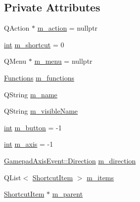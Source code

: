 \subsection*{Private Attributes}
\begin{DoxyCompactItemize}
\item 
Q\+Action $\ast$ \mbox{\hyperlink{class_q_g_b_a_1_1_shortcut_controller_1_1_shortcut_item_a98b53e93227bfc1a8dbaf56afd8adaa2}{m\+\_\+action}} = nullptr
\item 
\mbox{\hyperlink{ioapi_8h_a787fa3cf048117ba7123753c1e74fcd6}{int}} \mbox{\hyperlink{class_q_g_b_a_1_1_shortcut_controller_1_1_shortcut_item_a1bea13c3864471b1d58e7f4a5051c9f2}{m\+\_\+shortcut}} = 0
\item 
Q\+Menu $\ast$ \mbox{\hyperlink{class_q_g_b_a_1_1_shortcut_controller_1_1_shortcut_item_a220198c7d4f5e4f2b8e4bffc671d8849}{m\+\_\+menu}} = nullptr
\item 
\mbox{\hyperlink{class_q_g_b_a_1_1_shortcut_controller_1_1_shortcut_item_a28ffcf4fe5bf253d0d47e2357794ddf1}{Functions}} \mbox{\hyperlink{class_q_g_b_a_1_1_shortcut_controller_1_1_shortcut_item_af27f39bcaef074da4c4c2626401935d2}{m\+\_\+functions}}
\item 
Q\+String \mbox{\hyperlink{class_q_g_b_a_1_1_shortcut_controller_1_1_shortcut_item_a9ff15f852f8a091ef744791510dea023}{m\+\_\+name}}
\item 
Q\+String \mbox{\hyperlink{class_q_g_b_a_1_1_shortcut_controller_1_1_shortcut_item_a49b743f7a157d2c3fd2c81ececf08eb7}{m\+\_\+visible\+Name}}
\item 
\mbox{\hyperlink{ioapi_8h_a787fa3cf048117ba7123753c1e74fcd6}{int}} \mbox{\hyperlink{class_q_g_b_a_1_1_shortcut_controller_1_1_shortcut_item_a22127254a63c56474ec4bfc4d219d044}{m\+\_\+button}} = -\/1
\item 
\mbox{\hyperlink{ioapi_8h_a787fa3cf048117ba7123753c1e74fcd6}{int}} \mbox{\hyperlink{class_q_g_b_a_1_1_shortcut_controller_1_1_shortcut_item_a8974c03b016bd46a8b913e882bd248ae}{m\+\_\+axis}} = -\/1
\item 
\mbox{\hyperlink{class_q_g_b_a_1_1_gamepad_axis_event_a5d50ab74dce4e58252f2affb5f227bbc}{Gamepad\+Axis\+Event\+::\+Direction}} \mbox{\hyperlink{class_q_g_b_a_1_1_shortcut_controller_1_1_shortcut_item_ac10dbf2660b709580f95c4cee7280cd5}{m\+\_\+direction}}
\item 
Q\+List$<$ \mbox{\hyperlink{class_q_g_b_a_1_1_shortcut_controller_1_1_shortcut_item}{Shortcut\+Item}} $>$ \mbox{\hyperlink{class_q_g_b_a_1_1_shortcut_controller_1_1_shortcut_item_af8277820700758f29279cd661d8ebd7d}{m\+\_\+items}}
\item 
\mbox{\hyperlink{class_q_g_b_a_1_1_shortcut_controller_1_1_shortcut_item}{Shortcut\+Item}} $\ast$ \mbox{\hyperlink{class_q_g_b_a_1_1_shortcut_controller_1_1_shortcut_item_a319e3af2ad71cfcd4cb10f2b88c8669c}{m\+\_\+parent}}
\end{DoxyCompactItemize}


